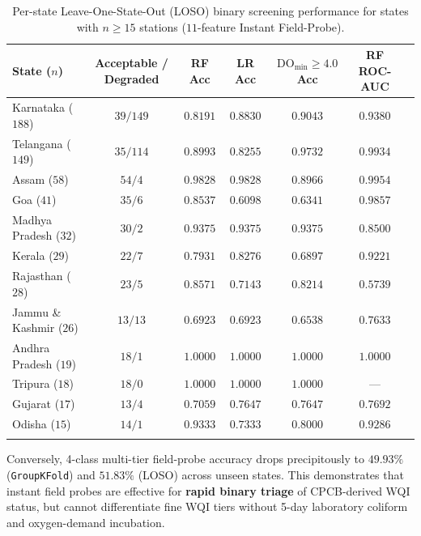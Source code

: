 \documentclass[pdflatex,sn-mathphys-num]{sn-jnl}%
\theoremstyle{thmstyleone}%
\theoremstyle{thmstyletwo}%
\theoremstyle{thmstylethree}%
\begin{document}
\begin{table}[t]
\caption{Per-state Leave-One-State-Out (LOSO) binary screening performance for states with $n \ge 15$ stations ($11$-feature Instant Field-Probe).}\label{tab:cpcb_loso_states}%
\tiny\setlength{\tabcolsep}{2pt}
\begin{tabular*}{\textwidth}{@{\extracolsep\fill}lcccccc@{}}
\toprule
State ($n$) & Acceptable / Degraded & RF Acc & LR Acc & $\text{DO}_{\min} \ge 4.0$ Acc & RF ROC-AUC \\
\midrule
Karnataka ($188$) & $39 / 149$ & $0.8191$ & $0.8830$ & $\mathbf{0.9043}$ & $0.9380$ \\
Telangana ($149$) & $35 / 114$ & $0.8993$ & $0.8255$ & $\mathbf{0.9732}$ & $0.9934$ \\
Assam ($58$) & $54 / 4$ & $\mathbf{0.9828}$ & $\mathbf{0.9828}$ & $0.8966$ & $0.9954$ \\
Goa ($41$) & $35 / 6$ & $\mathbf{0.8537}$ & $0.6098$ & $0.6341$ & $0.9857$ \\
Madhya Pradesh ($32$) & $30 / 2$ & $\mathbf{0.9375}$ & $\mathbf{0.9375}$ & $\mathbf{0.9375}$ & $0.8500$ \\
Kerala ($29$) & $22 / 7$ & $0.7931$ & $\mathbf{0.8276}$ & $0.6897$ & $0.9221$ \\
Rajasthan ($28$) & $23 / 5$ & $\mathbf{0.8571}$ & $0.7143$ & $0.8214$ & $0.5739$ \\
Jammu \& Kashmir ($26$) & $13 / 13$ & $\mathbf{0.6923}$ & $\mathbf{0.6923}$ & $0.6538$ & $0.7633$ \\
Andhra Pradesh ($19$) & $18 / 1$ & $\mathbf{1.0000}$ & $\mathbf{1.0000}$ & $\mathbf{1.0000}$ & $1.0000$ \\
Tripura ($18$) & $18 / 0$ & $\mathbf{1.0000}$ & $\mathbf{1.0000}$ & $\mathbf{1.0000}$ & --- \\
Gujarat ($17$) & $13 / 4$ & $0.7059$ & $\mathbf{0.7647}$ & $\mathbf{0.7647}$ & $0.7692$ \\
Odisha ($15$) & $14 / 1$ & $\mathbf{0.9333}$ & $0.7333$ & $0.8000$ & $0.9286$ \\
\botrule
\end{tabular*}
\end{table}

Conversely, 4-class multi-tier field-probe accuracy drops precipitously to $\mathbf{49.93\%}$ (\texttt{GroupKFold}) and $\mathbf{51.83\%}$ (LOSO) across unseen states. This demonstrates that instant field probes are effective for \textbf{rapid binary triage} of CPCB-derived WQI status, but cannot differentiate fine WQI tiers without 5-day laboratory coliform and oxygen-demand incubation.
\end{document}

